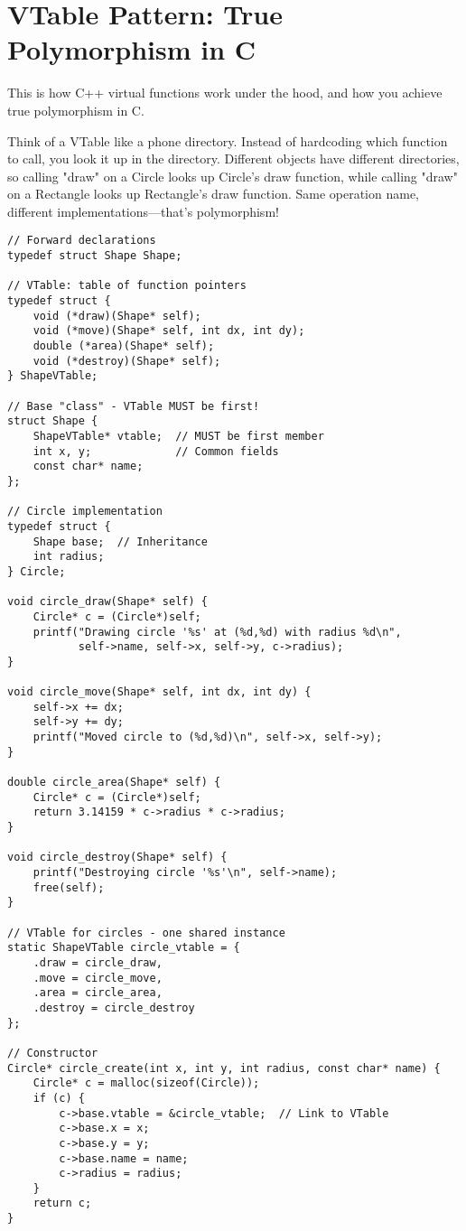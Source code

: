 \section{VTable Pattern: True Polymorphism in C}

This is how C++ virtual functions work under the hood, and how you achieve true polymorphism in C.

Think of a VTable like a phone directory. Instead of hardcoding which function to call, you look it up in the directory. Different objects have different directories, so calling "draw" on a Circle looks up Circle's draw function, while calling "draw" on a Rectangle looks up Rectangle's draw function. Same operation name, different implementations—that's polymorphism!

\begin{lstlisting}
// Forward declarations
typedef struct Shape Shape;

// VTable: table of function pointers
typedef struct {
    void (*draw)(Shape* self);
    void (*move)(Shape* self, int dx, int dy);
    double (*area)(Shape* self);
    void (*destroy)(Shape* self);
} ShapeVTable;

// Base "class" - VTable MUST be first!
struct Shape {
    ShapeVTable* vtable;  // MUST be first member
    int x, y;             // Common fields
    const char* name;
};

// Circle implementation
typedef struct {
    Shape base;  // Inheritance
    int radius;
} Circle;

void circle_draw(Shape* self) {
    Circle* c = (Circle*)self;
    printf("Drawing circle '%s' at (%d,%d) with radius %d\n",
           self->name, self->x, self->y, c->radius);
}

void circle_move(Shape* self, int dx, int dy) {
    self->x += dx;
    self->y += dy;
    printf("Moved circle to (%d,%d)\n", self->x, self->y);
}

double circle_area(Shape* self) {
    Circle* c = (Circle*)self;
    return 3.14159 * c->radius * c->radius;
}

void circle_destroy(Shape* self) {
    printf("Destroying circle '%s'\n", self->name);
    free(self);
}

// VTable for circles - one shared instance
static ShapeVTable circle_vtable = {
    .draw = circle_draw,
    .move = circle_move,
    .area = circle_area,
    .destroy = circle_destroy
};

// Constructor
Circle* circle_create(int x, int y, int radius, const char* name) {
    Circle* c = malloc(sizeof(Circle));
    if (c) {
        c->base.vtable = &circle_vtable;  // Link to VTable
        c->base.x = x;
        c->base.y = y;
        c->base.name = name;
        c->radius = radius;
    }
    return c;
}


\end{lstlisting}
